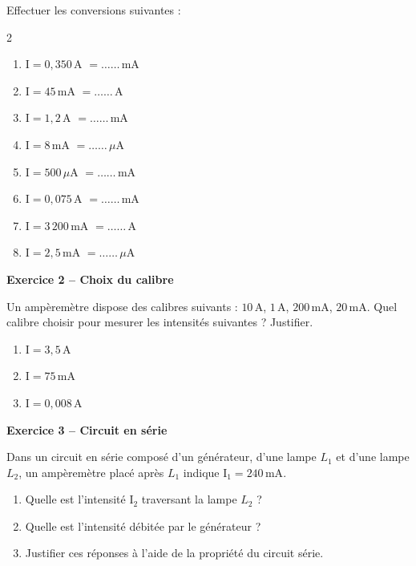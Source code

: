 \documentclass[11pt,a4paper]{article}
\newcommand{\cadreblanc}[1]{%
\medskip\framebox[\linewidth][c]{%
\rule{0mm}{#1mm}}\par
\medskip}
\begin{document}
Effectuer les conversions suivantes :
\begin{multicols}{2}
\begin{enumerate}
    \item $\mathrm{I} = 0{,}350\,\text{A}$ \quad $= \ldots\ldots\,\text{mA}$
    \item $\mathrm{I} = 45\,\text{mA}$ \quad $= \ldots\ldots\,\text{A}$
    \item $\mathrm{I} = 1{,}2\,\text{A}$ \quad $= \ldots\ldots\,\text{mA}$
    \item $\mathrm{I} = 8\,\text{mA}$ \quad $= \ldots\ldots\,\mu\text{A}$
    \item $\mathrm{I} = 500\,\mu\text{A}$ \quad $= \ldots\ldots\,\text{mA}$
    \item $\mathrm{I} = 0{,}075\,\text{A}$ \quad $= \ldots\ldots\,\text{mA}$
    \item $\mathrm{I} = 3\,200\,\text{mA}$ \quad $= \ldots\ldots\,\text{A}$
    \item $\mathrm{I} = 2{,}5\,\text{mA}$ \quad $= \ldots\ldots\,\mu\text{A}$
\end{enumerate}
\end{multicols}

\cadreblanc{25}

\textbf{Exercice 2 -- Choix du calibre}

Un ampèremètre dispose des calibres suivants : $10\,\text{A}$, $1\,\text{A}$, $200\,\text{mA}$, $20\,\text{mA}$. Quel calibre choisir pour mesurer les intensités suivantes ? Justifier.
\begin{enumerate}
    \item $\mathrm{I} = 3{,}5\,\text{A}$
    \item $\mathrm{I} = 75\,\text{mA}$
    \item $\mathrm{I} = 0{,}008\,\text{A}$
\end{enumerate}

\cadreblanc{25}

\textbf{Exercice 3 -- Circuit en série}

Dans un circuit en série composé d'un générateur, d'une lampe $L_1$ et d'une lampe $L_2$, un ampèremètre placé après $L_1$ indique $\mathrm{I}_1 = 240\,\text{mA}$.
\begin{enumerate}
    \item Quelle est l'intensité $\mathrm{I}_2$ traversant la lampe $L_2$ ?
    \item Quelle est l'intensité débitée par le générateur ?
    \item Justifier ces réponses à l'aide de la propriété du circuit série.
\end{enumerate}
\end{document}
